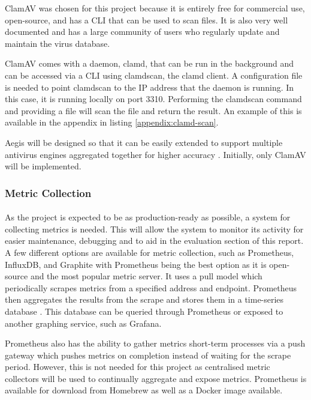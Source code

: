 \documentclass[12pt, conference, final, a4paper, onecolumn, compsoc]{IEEEtran}
\begin{document}
ClamAV was chosen for this project because it is entirely free for commercial
use, open-source, and has a CLI that can be used to scan files. It is also very
well documented and has a large community of users who regularly update and
maintain the virus database.

ClamAV comes with a daemon, clamd, that can be run in the background and can be
accessed via a CLI using clamdscan, the clamd client. A configuration file is
needed to point clamdscan to the IP address that the daemon is running. In this
case, it is running locally on port 3310. Performing the clamdscan command and
providing a file will scan the file and return the result. An example of this is
available in the appendix in listing \ref{appendix:clamd-scan}.

Aegis will be designed so that it can be easily extended to support multiple
antivirus engines aggregated together for higher accuracy \citep{av-comparison}.
Initially, only ClamAV will be implemented.

\subsubsection*{Metric Collection}
\paragraph{}

As the project is expected to be as production-ready as possible, a system for
collecting metrics is needed. This will allow the system to monitor its activity
for easier maintenance, debugging and to aid in the evaluation section of this
report. A few different options are available for metric collection, such as
Prometheus, InfluxDB, and Graphite with Prometheus being the best option as it
is open-source and the most popular metric server. It uses a pull model which
periodically scrapes metrics from a specified address and endpoint. Prometheus
then aggregates the results from the scrape and stores them in a time-series
database \citep{prom-docs}. This database can be queried through Prometheus or
exposed to another graphing service, such as Grafana.

Prometheus also has the ability to gather metrics short-term processes via a
push gateway which pushes metrics on completion instead of waiting for the
scrape period. However, this is not needed for this project as centralised
metric collectors will be used to continually aggregate and expose metrics.
Prometheus is available for download from Homebrew as well as a Docker image
available.
\end{document}
